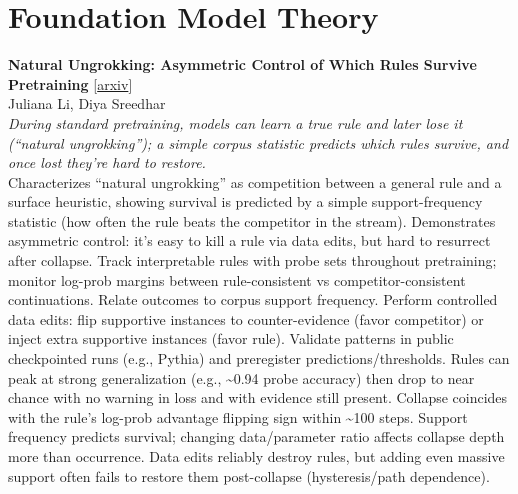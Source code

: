 \documentclass[12pt,letterpaper]{article}
\begin{document}
\medskip


\section*{Foundation Model Theory}

{\small\textbf{Natural Ungrokking: Asymmetric Control of Which Rules Survive Pretraining}} {\scriptsize[\href{https://arxiv.org/abs/2606.26050}{arxiv}]}\\
{\scriptsize Juliana Li, Diya Sreedhar}\\

{\small\textit{During standard pretraining, models can learn a true rule and later lose it (``natural ungrokking''); a simple corpus statistic predicts which rules survive, and once lost they're hard to restore.}}\\[1pt]
{\footnotesize Characterizes ``natural ungrokking'' as competition between a general rule and a surface heuristic, showing survival is predicted by a simple support-frequency statistic (how often the rule beats the competitor in the stream). Demonstrates asymmetric control: it's easy to kill a rule via data edits, but hard to resurrect after collapse. Track interpretable rules with probe sets throughout pretraining; monitor log-prob margins between rule-consistent vs competitor-consistent continuations. Relate outcomes to corpus support frequency. Perform controlled data edits: flip supportive instances to counter-evidence (favor competitor) or inject extra supportive instances (favor rule). Validate patterns in public checkpointed runs (e.g., Pythia) and preregister predictions/thresholds. Rules can peak at strong generalization (e.g., \textasciitilde{}0.94 probe accuracy) then drop to near chance with no warning in loss and with evidence still present. Collapse coincides with the rule's log-prob advantage flipping sign within \textasciitilde{}100 steps. Support frequency predicts survival; changing data/parameter ratio affects collapse depth more than occurrence. Data edits reliably destroy rules, but adding even massive support often fails to restore them post-collapse (hysteresis/path dependence).}

\medskip
\end{document}
